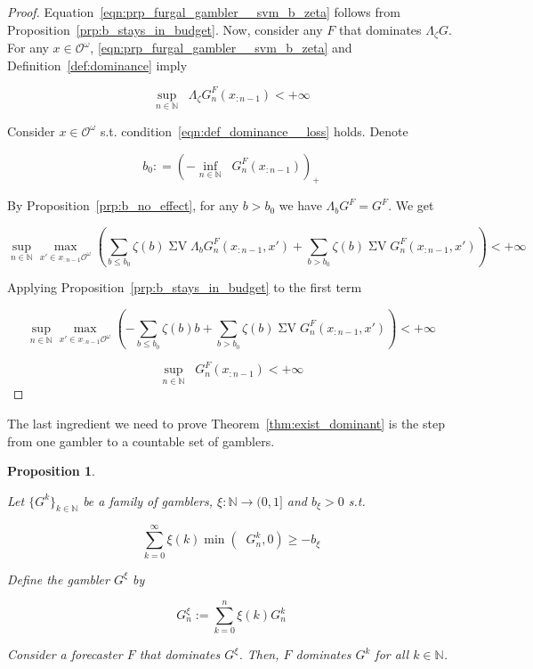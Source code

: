 \documentclass[aop,preprint]{imsart}
\numberwithin{equation}{section}
\theoremstyle{definition}
\theoremstyle{plain}
\newtheorem{proposition}{Proposition}[section]
\newcommand{\Nats}{\mathbb{N}}
\newcommand{\Sq}[2]{\{#1\}_{#2 \in \Nats}}
\newcommand{\Ob}{\mathcal{O}}
\newcommand{\OO}{\Ob^\omega}
\DeclareMathOperator{\SV}{\Sigma V}
\DeclareMathOperator{\SVM}{\Sigma V_{\min}}
\DeclareMathOperator{\SVX}{\Sigma V_{\max}}
\newcommand{\Bd}{\Lambda}
\begin{document}
\begin{proof}

Equation~\ref{eqn:prp_furgal_gambler__svm_b_zeta} follows from Proposition~\ref{prp:b_stays_in_budget}. Now, consider any $F$ that dominates $\Bd_\zeta G$. For any $x \in \OO$, \ref{eqn:prp_furgal_gambler__svm_b_zeta} and Definition~\ref{def:dominance} imply

\[\sup_{n \in \Nats} {\SVX \Bd_\zeta G^F_{n}\left(x_{:n-1}\right)} < +\infty\]

Consider $x \in \OO$ s.t. condition~\ref{eqn:def_dominance__loss} holds. Denote

\[b_0: = \left( -\inf_{n \in \Nats} {\SVM G^F_{n}\left(x_{:n-1}\right)}\right)_+\]

By Proposition~\ref{prp:b_no_effect}, for any $b > b_0$ we have $\Bd_b G^F = G^F$. We get

\[\sup_{n \in \Nats} \max_{x' \in x_{:n-1}\OO} \left(\sum_{b \leq b_0} \zeta\left(b\right) {\SV \Bd_b G^F_{n}\left(x_{:n-1},x'\right)} + \sum_{b > b_0} \zeta\left(b\right) \SV G^F_{n}\left(x_{:n-1},x'\right)\right) < +\infty\]

Applying Proposition~\ref{prp:b_stays_in_budget} to the first term

\[\sup_{n \in \Nats} \max_{x' \in x_{:n-1}\OO} \left(-\sum_{b \leq b_0} \zeta\left(b\right) b + \sum_{b > b_0} \zeta\left(b\right) \SV G^F_{n}\left(x_{:n-1},x'\right)\right) < +\infty\]

\[\sup_{n \in \Nats} \SVX G^F_{n}\left(x_{:n-1}\right) < +\infty\]
\end{proof}

The last ingredient we need to prove Theorem~\ref{thm:exist_dominant} is the step from one gambler to a countable set of gamblers.

\begin{proposition}
\label{prp:combining_gamblers}

Let $\Sq{G^k}{k}$ be a family of gamblers, $\xi: \Nats \rightarrow (0,1]$ and $b_\xi > 0$ s.t.

\begin{equation}
\label{eqn:prp_combining_gamblers__budget}
\sum_{k = 0}^\infty \xi\left(k\right) \min\left(\SVM G^k_n,0\right) \geq -b_\xi
\end{equation}

Define the gambler $G^\xi$ by

\begin{equation}
G^\xi_n := \sum_{k = 0}^n \xi\left(k\right) G^k_n
\end{equation}

Consider a forecaster $F$ that dominates $G^\xi$. Then, $F$ dominates $G^k$ for all $k \in \Nats$.

\end{proposition}
\end{document}
